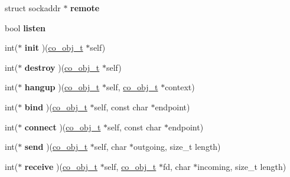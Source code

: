 \begin{DoxyCompactItemize}
\item 
\hypertarget{structco__socket__t_a19c78414f1bbd51f1d20627df6324db0}{struct sockaddr $\ast$ {\bfseries remote}}\label{structco__socket__t_a19c78414f1bbd51f1d20627df6324db0}

\item 
\hypertarget{structco__socket__t_a6560f74760929fd42d7e591da9404a36}{bool {\bfseries listen}}\label{structco__socket__t_a6560f74760929fd42d7e591da9404a36}

\item 
\hypertarget{structco__socket__t_a48ecad61f3b3595671545c8af8a727c1}{int($\ast$ {\bfseries init} )(\hyperlink{structco__obj__t}{co\-\_\-obj\-\_\-t} $\ast$self)}\label{structco__socket__t_a48ecad61f3b3595671545c8af8a727c1}

\item 
\hypertarget{structco__socket__t_a1c9bd51906559c2875900bc4918d90c4}{int($\ast$ {\bfseries destroy} )(\hyperlink{structco__obj__t}{co\-\_\-obj\-\_\-t} $\ast$self)}\label{structco__socket__t_a1c9bd51906559c2875900bc4918d90c4}

\item 
\hypertarget{structco__socket__t_ae4c1935afe6427418d2317f6af5baf63}{int($\ast$ {\bfseries hangup} )(\hyperlink{structco__obj__t}{co\-\_\-obj\-\_\-t} $\ast$self, \hyperlink{structco__obj__t}{co\-\_\-obj\-\_\-t} $\ast$context)}\label{structco__socket__t_ae4c1935afe6427418d2317f6af5baf63}

\item 
\hypertarget{structco__socket__t_a0b9945acdc194385674bd97cc93ab649}{int($\ast$ {\bfseries bind} )(\hyperlink{structco__obj__t}{co\-\_\-obj\-\_\-t} $\ast$self, const char $\ast$endpoint)}\label{structco__socket__t_a0b9945acdc194385674bd97cc93ab649}

\item 
\hypertarget{structco__socket__t_a8e8cf38911114c3695971adecfe0fb4a}{int($\ast$ {\bfseries connect} )(\hyperlink{structco__obj__t}{co\-\_\-obj\-\_\-t} $\ast$self, const char $\ast$endpoint)}\label{structco__socket__t_a8e8cf38911114c3695971adecfe0fb4a}

\item 
\hypertarget{structco__socket__t_ace5ee4d250ce5a73ed8b46ff769c075c}{int($\ast$ {\bfseries send} )(\hyperlink{structco__obj__t}{co\-\_\-obj\-\_\-t} $\ast$self, char $\ast$outgoing, size\-\_\-t length)}\label{structco__socket__t_ace5ee4d250ce5a73ed8b46ff769c075c}

\item 
\hypertarget{structco__socket__t_a0a0a266d5900a65047fea3f28892657a}{int($\ast$ {\bfseries receive} )(\hyperlink{structco__obj__t}{co\-\_\-obj\-\_\-t} $\ast$self, \hyperlink{structco__obj__t}{co\-\_\-obj\-\_\-t} $\ast$fd, char $\ast$incoming, size\-\_\-t length)}\label{structco__socket__t_a0a0a266d5900a65047fea3f28892657a}


\end{DoxyCompactItemize}
